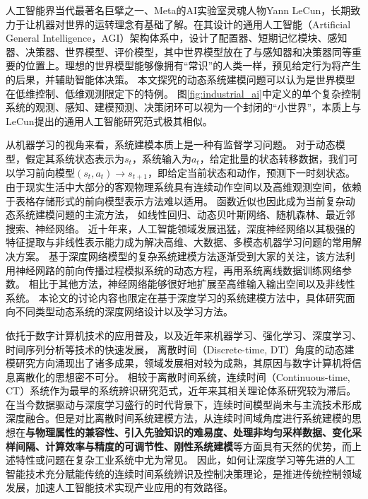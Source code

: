 人工智能界当代最著名巨擘之一、Meta的AI实验室灵魂人物Yann LeCun，长期致力于让机器对世界的运转理念有基础了解。在其设计的通用人工智能（Artificial General Intelligence，AGI）架构体系中，设计了配置器、短期记忆模块、感知器、决策器、世界模型、评价模型，其中世界模型放在了与感知器和决策器同等重要的位置上。理想的世界模型能够像拥有“常识”的人类一样，预见给定行为将产生的后果，并辅助智能体决策。
本文探究的动态系统建模问题可以认为是世界模型在低维控制、低维观测限定下的特例。
图\ref{fig:industrial_ai}中定义的单个复杂控制系统的观测、感知、建模预测、决策闭环可以视为一个封闭的“小世界”，本质上与LeCun提出的通用人工智能研究范式极其相似。

从机器学习的视角来看，系统建模本质上是一种有监督学习问题\cite{jordan1992forward}。
对于动态模型，假定其系统状态表示为$s_t$，系统输入为$a_t$，给定批量的状态转移数据，我们可以学习前向模型$\left(s_t, a_t\right) \rightarrow s_{t+1}$，即给定当前状态和动作，预测下一时刻状态。
由于现实生活中大部分的客观物理系统具有连续动作空间以及高维观测空间，依赖于表格存储形式的前向模型表示方法难以适用。
函数近似也因此成为当前复杂动态系统建模问题的主流方法，
如线性回归\cite{silver2008sample}、动态贝叶斯网络、随机森林、最近邻搜索、神经网络\cite{werbos1989neural}。
近十年来，人工智能领域发展迅猛，深度神经网络以其极强的特征提取与非线性表示能力成为解决高维、大数据、多模态机器学习问题的常用解决方案。
基于深度网络模型的复杂系统建模方法逐渐受到大家的关注，该方法利用神经网路的前向传播过程模拟系统的动态方程\cite{temeng1995model, tan1996nonlinear}，再用系统离线数据训练网络参数。
相比于其他方法，神经网络能够很好地扩展至高维输入输出空间以及非线性系统。
本论文的讨论内容也限定在基于深度学习的系统建模方法中，具体研究面向不同类型动态系统的深度网络设计以及学习方法。


依托于数字计算机技术的应用普及，以及近年来机器学习、强化学习\cite{sutton2018reinforcement}、深度学习\cite{lecun2015deep}\cite{duan2016}、时间序列分析等技术\cite{shumway2000time}的快速发展，
离散时间（Discrete-time, DT）角度的动态建模研究方向涌现出了诸多成果，领域发展相对较为成熟，其原因与数字计算机将信息离散化的思想密不可分。
相较于离散时间系统，连续时间（Continuous-time, CT）系统作为最早的系统辨识研究范式，近年来其相关理论体系研究较为滞后。在当今数据驱动与深度学习盛行的时代背景下，连续时间模型尚未与主流技术形成深度融合。但是对比离散时间系统建模方法，从连续时间域角度进行系统建模的思想在\textbf{与物理属性的兼容性、引入先验知识的难易度、处理非均匀采样数据、变化采样间隔、计算效率与精度的可调节性、刚性系统建模}等方面具有天然的优势，而上述特性或问题在复杂工业系统中尤为常见。
因此，如何让深度学习等先进的人工智能技术充分赋能传统的连续时间系统辨识及控制决策理论，是推进传统控制领域发展，加速人工智能技术实现产业应用的有效路径。

